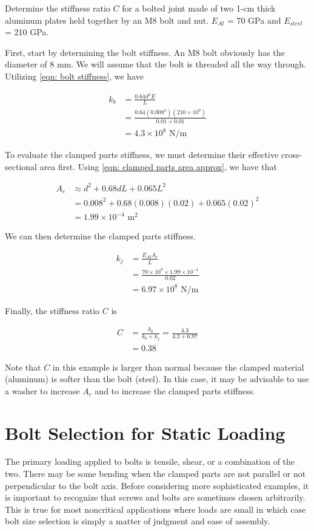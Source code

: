 \documentclass[a4paper,openany,12pt]{book}
\begin{document}
{{Determine the stiffness ratio \(C\) for a bolted joint made of two 1-cm
thick aluminum plates held together by an M8 bolt and nut. \(E_{Al}\) = 70
GPa and \(E_{steel}\) = 210 GPa.

First, start by determining the bolt stiffness. An M8 bolt obviously has
the diameter of 8 mm. We will assume that the bolt is threaded all the
way through. Utilizing \ref{eqn: bolt stiffness},
we have

$$\begin{aligned}
    k_b &= \frac{0.64d^2E}{L} \\
        &= \frac{0.64 (0.008^2)(210 \times 10^9)}{0.01+0.01} \\
        &= 4.3 \times 10^8 \text{ N/m}
  \end{aligned}$$

To evaluate the clamped parts stiffness, we must determine their
effective cross-sectional area first. Using
\ref{eqn: clamped parts area approx},
we have that

$$\begin{aligned}
    A_c &\approx d^2 + 0.68dL + 0.065L^2 \\
        &= 0.008^2 + 0.68(0.008)(0.02) + 0.065(0.02)^2 \\
        &= 1.99 \times 10^{-4} \text{ m}^2
  \end{aligned}$$

We can then determine the clamped parts stiffness.

$$\begin{aligned}
    k_j &= \frac{E_{Al}A_c}{L} \\
        &= \frac{70 \times 10^9 \times 1.99 \times 10^{-4}}{0.02} \\
        &= 6.97 \times 10^8 \text{ N/m}
  \end{aligned}$$

Finally, the stiffness ratio \(C\) is

$$\begin{aligned}
    C & = \frac{k_b}{k_b + k_j} = \frac{4.3}{4.3 + 6.97} \\
      &= 0.38
  \end{aligned}$$

Note that \(C\) in this example is larger than normal because the clamped
material (aluminum) is softer than the bolt (steel). In this case, it
may be advisable to use a washer to increase \(A_c\) and to increase the
clamped parts stiffness.

\section{Bolt Selection for Static Loading}
\label{bolt-selection-for-static-loading}
The primary loading applied to bolts is tensile, shear, or a combination
of the two. There may be some bending when the clamped parts are not
parallel or not perpendicular to the bolt axis. Before considering more
sophisticated examples, it is important to recognize that screws and
bolts are sometimes chosen arbitrarily. This is true for most
noncritical applications where loads are small in which case bolt size
selection is simply a matter of judgment and ease of assembly.

}}
\end{document}
